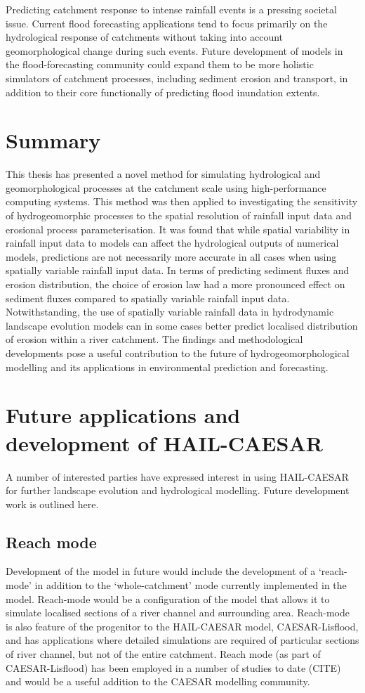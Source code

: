 Predicting catchment response to intense rainfall events is a pressing societal issue. Current flood forecasting applications tend to focus primarily on the hydrological response of catchments without taking into account geomorphological change during such events. Future development of models in the flood-forecasting community could expand them to be more holistic simulators of catchment processes, including sediment erosion and transport, in addition to their core functionally of predicting flood inundation extents. 

\section{Summary}
This thesis has presented a novel method for simulating hydrological and geomorphological processes at the catchment scale using high-performance computing systems. This method was then applied to investigating the sensitivity of hydrogeomorphic processes to the spatial resolution of rainfall input data and erosional process parameterisation. It was found that while spatial variability in rainfall input data to models can affect the hydrological outputs of numerical models, predictions are not necessarily more accurate in all cases when using spatially variable rainfall input data. In terms of predicting sediment fluxes and erosion distribution, the choice of erosion law had a more pronounced effect on sediment fluxes compared to spatially variable rainfall input data. Notwithstanding, the use of spatially variable rainfall data in hydrodynamic landscape evolution models can in some cases better predict localised distribution of erosion within a river catchment. The findings and methodological developments pose a useful contribution to the future of hydrogeomorphological modelling and its applications in environmental prediction and forecasting.

\section{Future applications and development of HAIL-CAESAR}

A number of interested parties have expressed interest in using HAIL-CAESAR for further landscape evolution and hydrological modelling. Future development work is outlined here.

\subsection{Reach mode}
Development of the model in future would include the development of a `reach-mode' in addition to the `whole-catchment' mode currently implemented in the model. Reach-mode would be a configuration of the model that allows it to simulate localised sections of a river channel and surrounding area. Reach-mode is also feature of the progenitor to the HAIL-CAESAR model, CAESAR-Lisflood, and has applications where detailed simulations are required of particular sections of river channel, but not of the entire catchment. Reach mode (as part of CAESAR-Lisflood) has been employed in a number of studies to date (CITE) and would be a useful addition to the CAESAR modelling community. 

